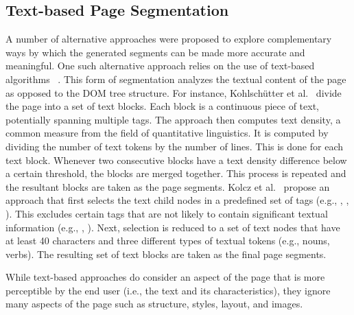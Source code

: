 \subsection{Text-based Page Segmentation}
A number of alternative approaches were proposed to explore complementary
ways by which the generated segments can be made more accurate and meaningful.
One such alternative approach relies on the use of text-based algorithms~
\cite{kohlschutter2008densitometric, kolcz2007site}.
This form of segmentation analyzes the textual content of
the page as opposed to the DOM tree structure.
For instance, Kohlsch{\"u}tter et al.~\cite{kohlschutter2008densitometric} divide the page into a set of text blocks.
Each block is a continuous piece of text, potentially spanning multiple tags.
The approach then computes text density, a common measure from the field of 
quantitative linguistics. It is computed by dividing the number of text tokens
by the number of lines. This is done for each text block.
Whenever two consecutive blocks have a text density difference below a certain threshold,
the blocks are merged together. This process is repeated and the resultant
blocks are taken as the page segments.
Kolcz et al.~\cite{kolcz2007site} propose an approach that first selects the text
child nodes in a predefined set of tags (e.g., , , ). This excludes
certain tags that are not likely to contain significant textual information (e.g., , ).
Next, selection is reduced to a set of text nodes that have at least
40 characters and three different types of textual tokens (e.g., nouns, verbs).
The resulting set of text blocks are taken as the final page segments.

While text-based approaches do consider an aspect of the page that is more
perceptible by the end user (i.e., the text and its characteristics),
they ignore many aspects of the page such as structure, styles, layout, and images.


